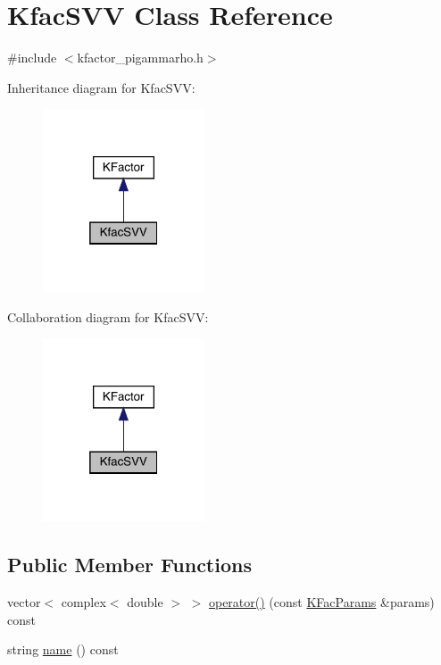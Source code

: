 \hypertarget{classKfacSVV}{}\section{Kfac\+S\+VV Class Reference}
\label{classKfacSVV}


{\ttfamily \#include $<$kfactor\+\_\+pigammarho.\+h$>$}



Inheritance diagram for Kfac\+S\+VV\+:
\nopagebreak
\begin{figure}[H]
\begin{center}
\leavevmode
\includegraphics[width=136pt]{d9/d5e/classKfacSVV__inherit__graph}
\end{center}
\end{figure}


Collaboration diagram for Kfac\+S\+VV\+:
\nopagebreak
\begin{figure}[H]
\begin{center}
\leavevmode
\includegraphics[width=136pt]{d5/d86/classKfacSVV__coll__graph}
\end{center}
\end{figure}
\subsection*{Public Member Functions}
\begin{DoxyCompactItemize}
\item 
vector$<$ complex$<$ double $>$ $>$ \mbox{\hyperlink{classKfacSVV_acb7f7f6bf0957694a73271704bb0569f}{operator()}} (const \mbox{\hyperlink{classKFacParams}{K\+Fac\+Params}} \&params) const
\item 
string \mbox{\hyperlink{classKfacSVV_ad7ab40ec924a678cd785a9743e676d6c}{name}} () const
\end{DoxyCompactItemize}


